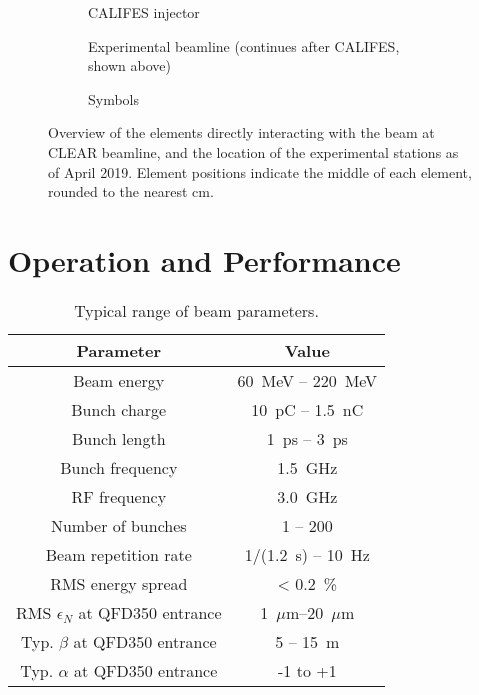\documentclass[a4paper,
               keeplastbox,   %
               ]{jacow}
\begin{document}
\begin{figure*}[t]
  \centering
  \begin{subfigure}{\textwidth}
    \centering
    
    \vspace{-2.5em} %
    \caption{CALIFES injector}
  \end{subfigure}
  \begin{subfigure}{\textwidth}
    \centering
    \vspace{-1em}
    
    \vspace{-0.5em}
    \caption{Experimental beamline
      (continues after CALIFES, shown above)}
  \end{subfigure}
  \begin{subfigure}{\textwidth}
    \centering
    \vspace{-0.5em}
    
    \vspace{-2em} %
    \caption{Symbols}
  \end{subfigure}
  \caption{Overview of the elements directly interacting with the beam at CLEAR beamline, and the location of the experimental stations as of April 2019. Element positions indicate the middle of each element, rounded to the nearest cm.}
  \label{fig:layout}
\end{figure*}

\section{Operation and Performance}

\begin{table}[t]
  \centering
  \caption{Typical range of beam parameters.}
  \label{tab:beamparameters}
  \begin{tabular}{c c}
    \toprule
    \textbf{Parameter} & \textbf{Value} \\
    \midrule
    Beam energy       &  60~MeV -- 220~MeV\\
    Bunch charge      &  10~pC  -- 1.5~nC \\
    Bunch length      &   1~ps  -- 3~ps \\
    Bunch frequency   &   1.5~GHz \\
    RF frequency      &   3.0~GHz \\
    Number of bunches &   1 -- 200 \\
    Beam repetition rate   & 1/(1.2~s) -- 10~Hz \\
    RMS energy spread & < 0.2~\% \\
    RMS $\epsilon_N$ at QFD350 entrance & 1~$\mu$m--20~$\mu$m\\
    Typ. $\beta$ at QFD350 entrance & 5 -- 15~m \\
    Typ. $\alpha$ at QFD350 entrance & -1 to +1 \\
    \bottomrule
  \end{tabular}
\end{table}
\end{document}
